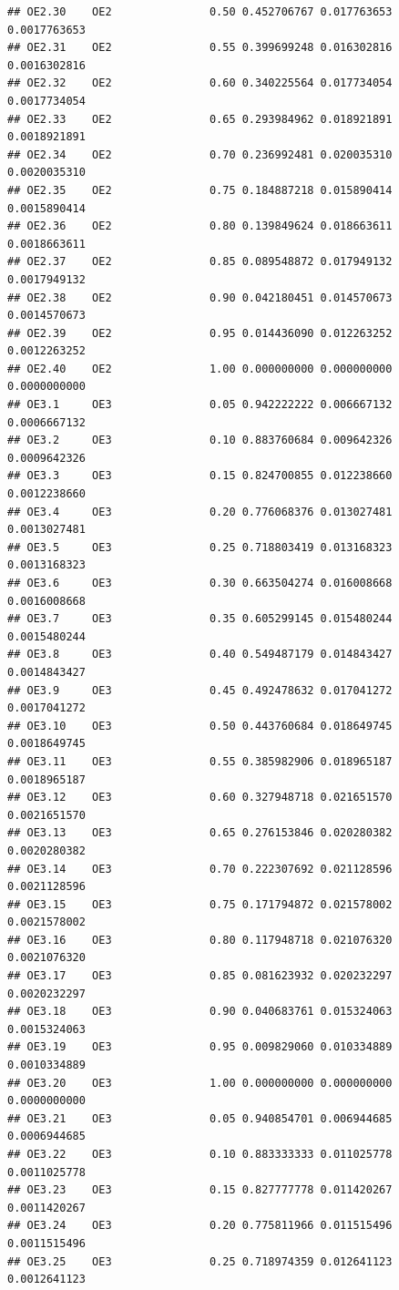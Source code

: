 \documentclass[
]{book}
\begin{document}
\begin{verbatim}
## OE2.30    OE2               0.50 0.452706767 0.017763653 0.0017763653
## OE2.31    OE2               0.55 0.399699248 0.016302816 0.0016302816
## OE2.32    OE2               0.60 0.340225564 0.017734054 0.0017734054
## OE2.33    OE2               0.65 0.293984962 0.018921891 0.0018921891
## OE2.34    OE2               0.70 0.236992481 0.020035310 0.0020035310
## OE2.35    OE2               0.75 0.184887218 0.015890414 0.0015890414
## OE2.36    OE2               0.80 0.139849624 0.018663611 0.0018663611
## OE2.37    OE2               0.85 0.089548872 0.017949132 0.0017949132
## OE2.38    OE2               0.90 0.042180451 0.014570673 0.0014570673
## OE2.39    OE2               0.95 0.014436090 0.012263252 0.0012263252
## OE2.40    OE2               1.00 0.000000000 0.000000000 0.0000000000
## OE3.1     OE3               0.05 0.942222222 0.006667132 0.0006667132
## OE3.2     OE3               0.10 0.883760684 0.009642326 0.0009642326
## OE3.3     OE3               0.15 0.824700855 0.012238660 0.0012238660
## OE3.4     OE3               0.20 0.776068376 0.013027481 0.0013027481
## OE3.5     OE3               0.25 0.718803419 0.013168323 0.0013168323
## OE3.6     OE3               0.30 0.663504274 0.016008668 0.0016008668
## OE3.7     OE3               0.35 0.605299145 0.015480244 0.0015480244
## OE3.8     OE3               0.40 0.549487179 0.014843427 0.0014843427
## OE3.9     OE3               0.45 0.492478632 0.017041272 0.0017041272
## OE3.10    OE3               0.50 0.443760684 0.018649745 0.0018649745
## OE3.11    OE3               0.55 0.385982906 0.018965187 0.0018965187
## OE3.12    OE3               0.60 0.327948718 0.021651570 0.0021651570
## OE3.13    OE3               0.65 0.276153846 0.020280382 0.0020280382
## OE3.14    OE3               0.70 0.222307692 0.021128596 0.0021128596
## OE3.15    OE3               0.75 0.171794872 0.021578002 0.0021578002
## OE3.16    OE3               0.80 0.117948718 0.021076320 0.0021076320
## OE3.17    OE3               0.85 0.081623932 0.020232297 0.0020232297
## OE3.18    OE3               0.90 0.040683761 0.015324063 0.0015324063
## OE3.19    OE3               0.95 0.009829060 0.010334889 0.0010334889
## OE3.20    OE3               1.00 0.000000000 0.000000000 0.0000000000
## OE3.21    OE3               0.05 0.940854701 0.006944685 0.0006944685
## OE3.22    OE3               0.10 0.883333333 0.011025778 0.0011025778
## OE3.23    OE3               0.15 0.827777778 0.011420267 0.0011420267
## OE3.24    OE3               0.20 0.775811966 0.011515496 0.0011515496
## OE3.25    OE3               0.25 0.718974359 0.012641123 0.0012641123

\end{verbatim}
\end{document}
